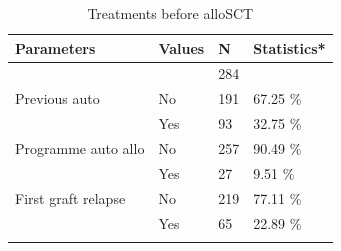 \documentclass[a4paper,11pt] {article}
\begin{document}
\begin{longtable}{llll}
  \hline
Parameters & Values & N & Statistics* \\ 
  \hline
 &  & 284 &  \\ 
  Previous auto & No & 191 & 67.25 \% \\ 
   & Yes & 93 & 32.75 \% \\ 
   Programme auto allo & No & 257 & 90.49 \% \\ 
   & Yes & 27 & 9.51 \% \\ 
  First graft relapse & No & 219 & 77.11 \% \\ 
   & Yes & 65 & 22.89 \% \\ 
   \hline
\hline
\caption{Treatments before alloSCT} 
\label{tab:avtg}
\end{longtable}\pagebreak
\end{document}
